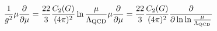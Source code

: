 \begin{equation}
  {1 \over g^2} \mu {\partial \over \partial \mu}
  = {22 \over 3}{C_2(G) \over (4\pi)^2} \ln {\mu \over \Lambda_{\rm QCD}}  \mu {\partial \over \partial \mu}
  =  {22 \over 3}{C_2(G) \over (4\pi)^2}   {\partial \over \partial \ln \ln {\mu \over \Lambda_{\rm QCD}}}  
\label{difftransf}
\end{equation}

